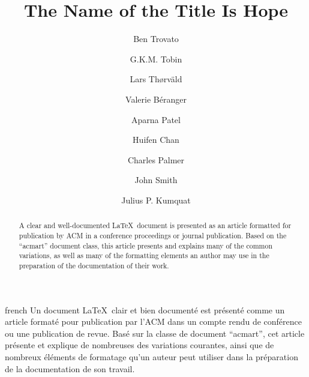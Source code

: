 \documentclass[sigconf, language=english, language=german,language=french]{acmart}
\begin{document}
\title{The Name of the Title Is Hope}

\author{Ben Trovato}
\author{G.K.M. Tobin}
\authornotemark[1]

\author{Lars Th{\o}rv{\"a}ld}

\author{Valerie B\'eranger}

\author{Aparna Patel}

\author{Huifen Chan}

\author{Charles Palmer}

\author{John Smith}

\author{Julius P. Kumquat}

\begin{abstract}
  A clear and well-documented \LaTeX\ document is presented as an
  article formatted for publication by ACM in a conference proceedings
  or journal publication. Based on the ``acmart'' document class, this
  article presents and explains many of the common variations, as well
  as many of the formatting elements an author may use in the
  preparation of the documentation of their work.
\end{abstract}

\begin{translatedabstract}{french}
  Un document \LaTeX\ clair et bien documenté est présenté comme un
  article formaté pour publication par l'ACM dans un compte rendu de
  conférence ou une publication de revue. Basé sur la classe de
  document ``acmart'', cet article présente et explique de nombreuses
  des variations courantes, ainsi que de nombreux éléments de
  formatage qu'un auteur peut utiliser dans la préparation de la
  documentation de son travail.
\end{translatedabstract}
\end{document}
